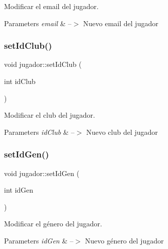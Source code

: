 Modificar el email del jugador. 


\begin{DoxyParams}{Parameters}
{\em email} & --$>$ Nuevo email del jugador \\
\hline
\end{DoxyParams}
\mbox{\label{classjugador_ac869d669d44efd142595e087cbb2b3f3}} 
\subsubsection{\texorpdfstring{set\+Id\+Club()}{setIdClub()}}
{\footnotesize\ttfamily void jugador\+::set\+Id\+Club (\begin{DoxyParamCaption}\item[{int}]{id\+Club }\end{DoxyParamCaption})}



Modificar el club del jugador. 


\begin{DoxyParams}{Parameters}
{\em id\+Club} & --$>$ Nuevo club del jugador \\
\hline
\end{DoxyParams}
\mbox{\label{classjugador_aa0fd016230cc38f0ac2e7cd6c90003d3}} 
\subsubsection{\texorpdfstring{set\+Id\+Gen()}{setIdGen()}}
{\footnotesize\ttfamily void jugador\+::set\+Id\+Gen (\begin{DoxyParamCaption}\item[{int}]{id\+Gen }\end{DoxyParamCaption})}



Modificar el género del jugador. 


\begin{DoxyParams}{Parameters}
{\em id\+Gen} & --$>$ Nuevo género del jugador \\
\hline
\end{DoxyParams}
\mbox{\label{classjugador_a0dcf58840f95ad87661987f7750c4355}} 
